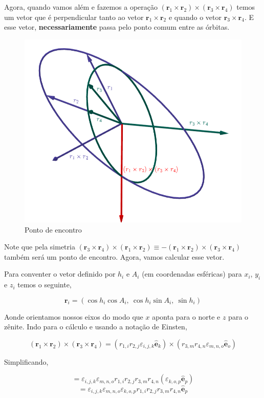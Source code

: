 \documentclass[11pt]{article}
\begin{document}
\begin{pproblem}
\begin{pssolution*}{}{}
    Agora, quando vamos além e fazemos a operação \((\mathbf r_1 \times \mathbf r_2)\times(\mathbf r_3 \times \mathbf r_4)\) temos um vetor que é perpendicular tanto ao vetor \(\mathbf r_1\times \mathbf r_2\) e quando o vetor \(\mathbf r_3\times \mathbf r_4\). E esse vetor, \textbf{necessariamente} passa pelo ponto comum entre as órbitas.

    \begin{figure}[H]
        \centering
        \includegraphics[width=0.8\linewidth]{imagens/orbitas4.png}
        \caption{Ponto de encontro}
    \end{figure}

    Note que pela simetria $(\mathbf r_3\times \mathbf r_4)\times(\mathbf r_1\times \mathbf r_2)\equiv - (\mathbf r_1 \times \mathbf r_2)\times (\mathbf r_3 \times \mathbf r_4)$ também será um ponto de encontro. Agora, vamos calcular esse vetor.

    Para conventer o vetor definido por $h_i$ e $A_i$ (em coordenadas esféricas) para $x_i$, $y_i$ e $z_i$ temos o seguinte, 

    $$\mathbf r_i = (\cos h_i\cos A_i, \ \cos h_i\sin A_i, \ \sin h_i)$$

    Aonde orientamos nossos eixos do modo que $x$ aponta para o norte e $z$ para o zênite. Indo para o cálculo e usando a notação de Einsten, 

    \[(\mathbf r_1 \times \mathbf r_2)\times(\mathbf r_3 \times \mathbf r_4) = (r_{1,i}r_{2,j}\varepsilon_{i,j,k}\mathbf{\hat{e}}_k)\times(r_{3,m}r_{4,n}\varepsilon_{m,n,o}\mathbf{\hat{e}}_o)\]

    Simplificando, 

    \[= \varepsilon_{i,j,k}\varepsilon_{m,n,o}r_{1,i}r_{2,j}r_{3,m}r_{4,n}(\varepsilon_{k,o,p}\mathbf{\hat{e}}_p)\]
    \[= \varepsilon_{i,j,k}\varepsilon_{m,n,o}\varepsilon_{k,o,p}r_{1,i}r_{2,j}r_{3,m}r_{4,n}\mathbf{\hat{e}}_p\]


\end{pssolution*}
\end{pproblem}
\end{document}
